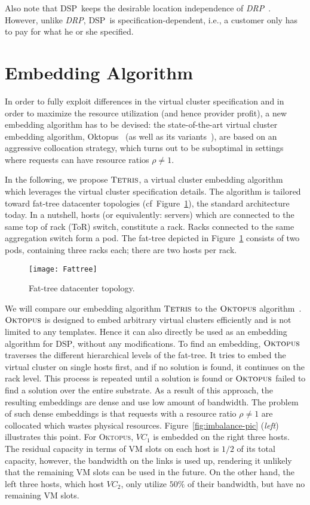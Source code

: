 \documentclass{sig-alternate-per}
\newcommand{\ALG}{\textsc{Tetris}}
\newcommand{\OKTO}{\textsc{Oktopus}}
\newcommand{\pricing}{\textsc{DSP}}
\begin{document}
Also note that \pricing~keeps the desirable location independence of \emph{DRP}~\cite{short-ballani2011price}.
However, unlike \emph{DRP}, \pricing~is specification-dependent, i.e., a customer only has to pay
for what he or she specified.

\section{Embedding Algorithm}\label{sec:algo}

In order to fully exploit differences in the virtual cluster specification and in order
to maximize the resource utilization (and hence provider profit),
a new embedding algorithm has to be devised: the state-of-the-art virtual cluster
embedding algorithm, Oktopus~\cite{short-ballani2011towards} (as well as its variants~\cite{short-proteus}), are
based on an aggressive collocation strategy, which turns out to be suboptimal in settings where requests can have
resource ratios $\rho\neq1$.

In the following, we propose $\ALG$, a virtual cluster embedding algorithm which leverages the virtual cluster
specification details.
 The algorithm is tailored toward fat-tree datacenter topologies (cf~Figure~\ref{fig:fattree-pic}),
 the standard architecture today.
In a nutshell, hosts (or equivalently: servers) which are connected to the same top of rack (ToR) switch, constitute a
rack.
Racks connected to the same aggregation switch form a pod. The fat-tree depicted in Figure~\ref{fig:fattree-pic}
consists of two pods,
containing three racks each; there are two hosts per rack.

\begin{figure}[t]
  \centering
\texttt{[image: Fattree]}
      \caption{Fat-tree datacenter topology.}
      \label{fig:fattree-pic}
  \end{figure}

We will compare our embedding algorithm $\ALG$ to the $\OKTO$ algorithm~\cite{short-ballani2011towards}. $\OKTO$ is designed to embed arbitrary virtual clusters efficiently and is
not limited
to any templates. Hence it can also directly be used as an embedding algorithm for \pricing, without any modifications.
To find an embedding, $\OKTO$ traverses the different hierarchical levels of the fat-tree. It tries to
embed
the virtual cluster on single hosts first, and if no solution is found, it continues on the rack level. This process is
repeated until a
solution is found or $\OKTO$ failed to find a solution over the entire substrate. As a result of this approach, the
resulting embeddings are dense and use low amount of bandwidth.
The problem of such dense embeddings is that requests with a resource ratio $\rho \neq1$ are collocated which wastes
physical resources. Figure~\ref{fig:imbalance-pic} (\emph{left}) illustrates this point.
For \OKTO, $VC_1$ is embedded on the right three hosts. The residual capacity in terms of VM slots on each host is $1/2$ of its total capacity,
however, the bandwidth on the links is used up, rendering it unlikely that the remaining VM slots
can be used in the future. On the other hand, the left three hosts, which host $VC_2$, only utilize $50\%$ of their bandwidth, but have
no remaining VM
slots.
\end{document}
